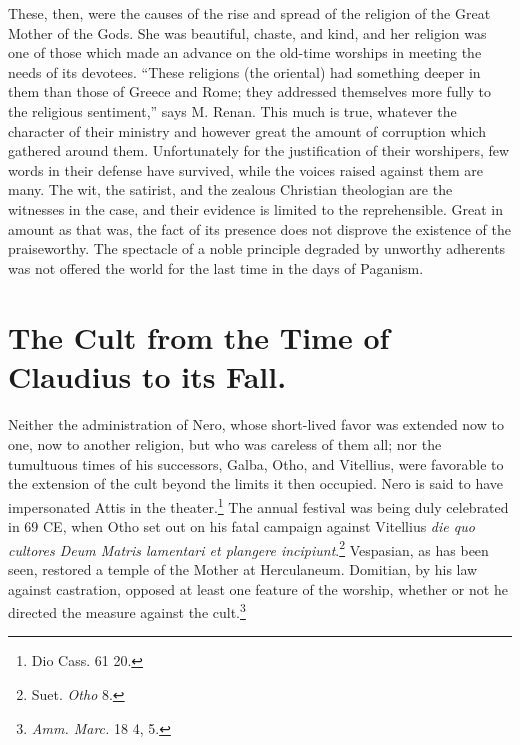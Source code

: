 \documentclass[a4paper, 11pt, oneside, polutonikogreek, english]{article}
\begin{document}
These, then, were the causes of the rise and spread of the religion of the Great Mother of the Gods. She was beautiful, chaste, and kind, and her religion was one of those which made an advance on the old-time worships in meeting the needs of its devotees. ``These religions (the oriental) had something deeper in them than those of Greece and Rome; they addressed themselves more fully to the religious sentiment,'' says M. Renan. This much is true, whatever the character of their ministry and however great the amount of corruption which gathered around them. Unfortunately for the justification of their worshipers, few words in their defense have survived, while the voices raised against them are many. The wit, the satirist, and the zealous Christian theologian are the witnesses in the case, and their evidence is limited to the reprehensible. Great in amount as that was, the fact of its presence does not disprove the existence of the praiseworthy. The spectacle of a noble principle degraded by unworthy adherents was not offered the world for the last time in the days of Paganism.
\clearpage
\section{The Cult from the Time of Claudius to its Fall.}
\paragraph{}
Neither the administration of Nero, whose short-lived favor was extended now to one, now to another religion, but who was careless of them all; nor the tumultuous times of his successors, Galba, Otho, and Vitellius, were favorable to the extension of the cult beyond the limits it then occupied. Nero is said to have impersonated Attis in the theater.\footnote{Dio Cass. 61 20.} The annual festival was being duly celebrated in 69 \textsc{CE}, when Otho set out on his fatal campaign against Vitellius \emph{die quo cultores Deum Matris lamentari et plangere incipiunt}.\footnote{Suet. \emph{Otho} 8.} Vespasian, as has been seen, restored a temple of the Mother at Herculaneum. Domitian, by his law against castration, opposed at least one feature of the worship, whether or not he directed the measure against the cult.\footnote{\emph{Amm. Marc.} 18 4, 5.}
\end{document}
